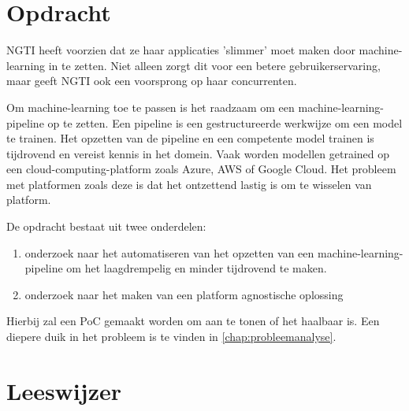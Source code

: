 \section{Opdracht}\label{sec:opdracht}
NGTI heeft voorzien dat ze haar applicaties 'slimmer' moet maken door \gls{machine-learning} in te zetten. Niet alleen zorgt dit voor een betere gebruikerservaring, maar geeft NGTI ook een voorsprong op haar concurrenten.

Om \gls{machine-learning} toe te passen is het raadzaam om een \gls{machine-learning-pipeline} op te zetten. Een pipeline is een gestructureerde werkwijze om een model te trainen. Het opzetten van de pipeline en een competente model trainen is tijdrovend en vereist kennis in het domein. Vaak worden modellen getrained op een \gls{cloud-computing-platform} zoals Azure, AWS of Google Cloud. Het probleem met platformen zoals deze is dat het ontzettend lastig is om te wisselen van platform.\bigskip\bigskip\bigskip\bigskip\bigskip

De opdracht bestaat uit twee onderdelen:
\begin{enumerate}
  \item onderzoek naar het automatiseren van het opzetten van een \gls{machine-learning-pipeline} om het laagdrempelig en minder tijdrovend te maken.
  \item onderzoek naar het maken van een platform agnostische oplossing
\end{enumerate}

Hierbij zal een PoC gemaakt worden om aan te tonen of het haalbaar is. Een diepere duik in het probleem is te vinden in \autoref{chap:probleemanalyse}.

\section{Leeswijzer}\label{sec:leeswijzer}
